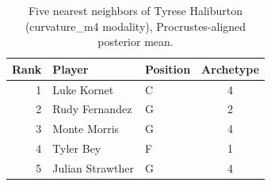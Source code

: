 \begin{table}[htbp]
  \centering\small
  \begin{tabular}{rllc}
    \toprule
    Rank & Player & Position & Archetype \\
    \midrule
    1 & Luke Kornet & C & 4 \\
    2 & Rudy Fernandez & G & 2 \\
    3 & Monte Morris & G & 4 \\
    4 & Tyler Bey & F & 1 \\
    5 & Julian Strawther & G & 4 \\
    \bottomrule
  \end{tabular}
  \caption{Five nearest neighbors of Tyrese Haliburton (curvature_m4 modality), Procrustes-aligned posterior mean.}
  \label{tab:Tyrese_Haliburton_neighbors_curvature_m4}
\end{table}

